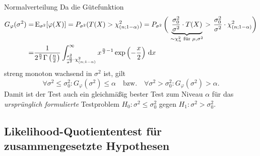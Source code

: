 \begin{example}{Normalverteilung}
    Da die Gütefunktion
    \begin{align*}
        G_{\varphi}(\sigma^2)  = & \operatorname{E}_{\sigma^2}[\varphi(X)] = P_{\sigma^2}(T(X) > \chi^2_{(n; 1 - \alpha)}) = P_{\sigma^2}\left(\vphantom{\frac{\sigma_0^2}{\sigma^2}}\right. \underbrace{\frac{\sigma_0^2}{\sigma^2} \cdot T(X)}_{\sim \chi^2_n \text{ für } \mu, \sigma^2} > \left.\frac{\sigma_0^2}{\sigma^2} \cdot \chi^2_{(n; 1 - \alpha)}\right) \\
        =                        & \frac{1}{2^{\frac{n}{2}} \Gamma\left(\frac{n}{2}\right)} \int_{\frac{\sigma_0^2}{\sigma^2} \cdot \chi^2_{(n; 1 - \alpha)}}^{\infty} x^{\frac{n}{2} - 1} \exp \left( -\frac{x}{2} \right) \, \mathrm{d}x
    \end{align*}
    streng monoton wachsend in $\sigma^2$ ist, gilt
    \[
        \forall \sigma^2 \leq \sigma_0^2 : G_{\varphi}(\sigma^2) \leq \alpha \quad \text{bzw.} \quad \forall \sigma^2 > \sigma_0^2 : G_{\varphi}(\sigma^2) > \alpha.
    \]
    Damit ist der Test auch ein gleichmäßig bester Test zum Niveau $\alpha$ für das \textit{ursprünglich formulierte} Testproblem $H_0: \sigma^2 \leq \sigma_0^2$ gegen $H_1: \sigma^2 > \sigma_0^2$.
\end{example}


\subsection{Likelihood-Quotiententest für zusammengesetzte Hypothesen}


